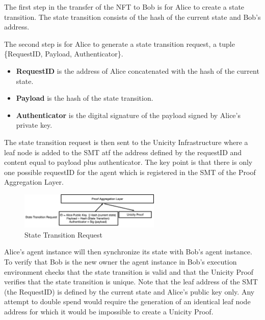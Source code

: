 \documentclass{article}
\begin{document}
\vspace{2mm}

The first step in the transfer of the NFT to Bob is for Alice to create a state transition. The state transition consists of the hash of the current state and Bob's address. 

\vspace{2mm}
The second step is for Alice to generate a state transition request, a tuple \{RequestID, Payload, Authenticator\}.

\begin{itemize}
\setlength{\leftmargin}{1em}
 \item  \textbf{RequestID} is the address of Alice concatenated with the hash of the current state.
 \item \textbf{Payload} is the hash of the state transition. 
 \item \textbf{Authenticator} is the digital signature of the payload signed by Alice’s private key.
\end{itemize}

The state transition request is then sent to the Unicity Infrastructure where a leaf node is added to the SMT atf the address defined by the requestID and content equal to payload plus authenticator. The key point is that there is only one possible requestID for the agent which is registered in the SMT of the Proof Aggregation Layer.

\begin{figure}[H]
    \centering
    \includegraphics[width=0.6\textwidth]{STR.png}
    \caption{State Transition Request}
    \label{fig:STR}
\end{figure}




Alice's agent instance will then synchronize its state with Bob's agent instance. To verify that Bob is the new owner the agent instance in Bob's execution environment checks that the state transition is valid and that the Unicity Proof verifies that the state transition is unique. Note that the leaf address of the SMT (the RequestID) is defined by the current state and Alice’s public key only.  Any attempt to double spend would require the generation of an identical leaf node address for which it would be impossible to create a Unicity Proof.
\end{document}
